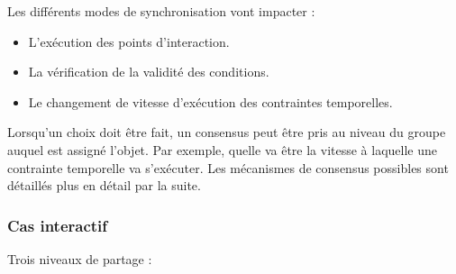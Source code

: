 \documentclass{article}
\newcommand\triggers{points d'interaction\xspace}
\begin{document}
Les différents modes de synchronisation vont impacter : 
\begin{itemize}
    \item L'exécution des \triggers.
    \item La vérification de la validité des conditions.
    \item Le changement de vitesse d'exécution des contraintes temporelles.
\end{itemize}

Lorsqu'un choix doit être fait, un consensus peut être pris au niveau du groupe auquel est assigné l'objet. 
Par exemple, quelle va être la vitesse à laquelle une contrainte temporelle va s'exécuter.
Les mécanismes de consensus possibles sont détaillés plus en détail par la suite.

\subsubsection{Cas interactif}
Trois niveaux de partage : 
\end{document}
